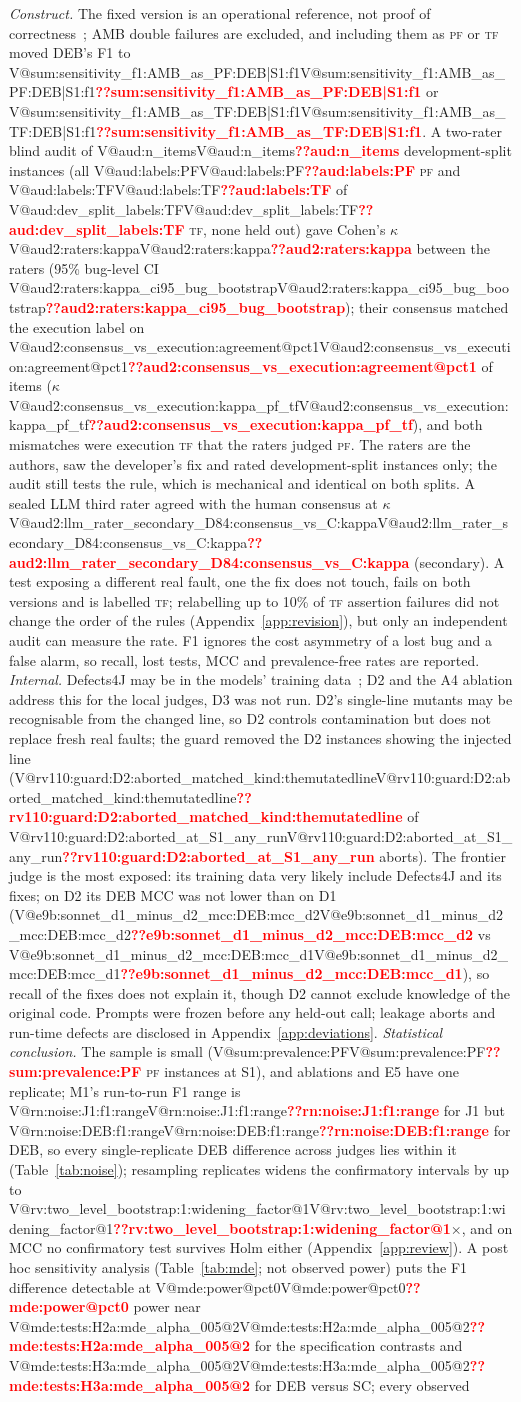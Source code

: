\documentclass[pdflatex,iicol,sn-mathphys-num]{sn-jnl}
\makeatletter
\newcommand{\V}[1]{\ifcsname V@#1\endcsname\csname V@#1\endcsname\else\textbf{\textcolor{red}{??#1}}\fi}
\newcommand{\PF}{\textsc{pf}}
\newcommand{\TF}{\textsc{tf}}
\makeatother
\begin{document}
\textit{Construct.} The fixed version is an operational reference, not proof of correctness~\cite{zhao2026misguidance}; AMB double failures are excluded, and including them as \PF{} or \TF{} moved DEB's F1 to \V{sum:sensitivity_f1:AMB_as_PF:DEB|S1:f1} or \V{sum:sensitivity_f1:AMB_as_TF:DEB|S1:f1}. A two-rater blind audit of \V{aud:n_items} development-split instances (all \V{aud:labels:PF} \PF{} and \V{aud:labels:TF} of \V{aud:dev_split_labels:TF} \TF{}, none held out) gave Cohen's $\kappa$~\cite{cohen1960kappa} \V{aud2:raters:kappa} between the raters (95\% bug-level CI \V{aud2:raters:kappa_ci95_bug_bootstrap}); their consensus matched the execution label on \V{aud2:consensus_vs_execution:agreement@pct1} of items ($\kappa$ \V{aud2:consensus_vs_execution:kappa_pf_tf}), and both mismatches were execution \TF{} that the raters judged \PF{}. The raters are the authors, saw the developer's fix and rated development-split instances only; the audit still tests the rule, which is mechanical and identical on both splits. A sealed LLM third rater agreed with the human consensus at $\kappa$ \V{aud2:llm_rater_secondary_D84:consensus_vs_C:kappa} (secondary). A test exposing a different real fault, one the fix does not touch, fails on both versions and is labelled \TF{}; relabelling up to 10\% of \TF{} assertion failures did not change the order of the rules (Appendix~\ref{app:revision}), but only an independent audit can measure the rate. F1 ignores the cost asymmetry of a lost bug and a false alarm, so recall, lost tests, MCC and prevalence-free rates are reported. \textit{Internal.} Defects4J may be in the models' training data~\cite{huang2026ult}; D2 and the A4 ablation address this for the local judges, D3 was not run. D2's single-line mutants may be recognisable from the changed line, so D2 controls contamination but does not replace fresh real faults; the guard removed the D2 instances showing the injected line (\V{rv110:guard:D2:aborted_matched_kind:themutatedline} of \V{rv110:guard:D2:aborted_at_S1_any_run} aborts). The frontier judge is the most exposed: its training data very likely include Defects4J and its fixes; on D2 its DEB MCC was not lower than on D1 (\V{e9b:sonnet_d1_minus_d2_mcc:DEB:mcc_d2} vs \V{e9b:sonnet_d1_minus_d2_mcc:DEB:mcc_d1}), so recall of the fixes does not explain it, though D2 cannot exclude knowledge of the original code. Prompts were frozen before any held-out call; leakage aborts and run-time defects are disclosed in Appendix~\ref{app:deviations}. \textit{Statistical conclusion.} The sample is small (\V{sum:prevalence:PF} \PF{} instances at S1), and ablations and E5 have one replicate; M1's run-to-run F1 range is \V{rn:noise:J1:f1:range} for J1 but \V{rn:noise:DEB:f1:range} for DEB, so every single-replicate DEB difference across judges lies within it (Table~\ref{tab:noise}); resampling replicates widens the confirmatory intervals by up to \V{rv:two_level_bootstrap:1:widening_factor@1}$\times$, and on MCC no confirmatory test survives Holm either (Appendix~\ref{app:review}). A post hoc sensitivity analysis (Table~\ref{tab:mde}; not observed power) puts the F1 difference detectable at \V{mde:power@pct0} power near \V{mde:tests:H2a:mde_alpha_005@2} for the specification contrasts and \V{mde:tests:H3a:mde_alpha_005@2} for DEB versus SC; every observed 
\end{document}
